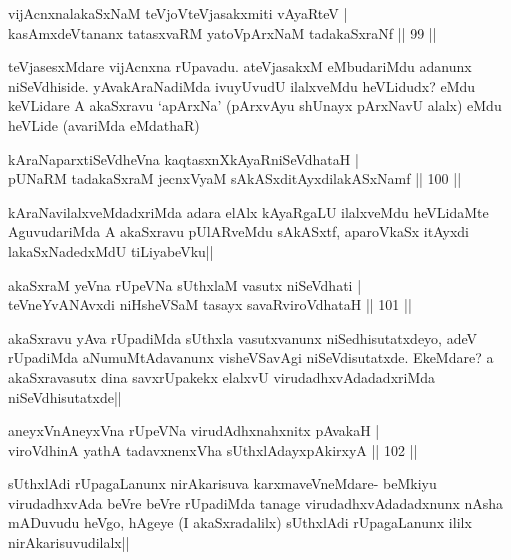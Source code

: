 \begin{shl}
vijAcnxnalakaSxNaM teVjoV\s teVjasakxmiti vAyaRteV |\\
kasAmxdeVtananx tatasxvaRM yatoV\s pArxNaM tadakaSxraNf \hfill || 99 ||
\end{shl}

\begin{artha}%
teVjasesxMdare vijAcnxna rUpavadu. ateVjasakxM eMbudariMdu adanunx niSeVdhiside. yAvakAraNadiMda ivuyUvudU ilalxveMdu heVLidudx? eMdu keVLidare A akaSxravu `apArxNa' (pArxvAyu shUnayx pArxNavU alalx) eMdu heVLide (avariMda eMdathaR)
\end{artha}


\begin{shl}
kAraNaparxtiSeVdheVna kaqtasxnXkAyaRniSeVdhataH |\\
pUNaRM tadakaSxraM jecnxVyaM sAkASxditAyxdilakASxNamf \hfill || 100 ||
\end{shl}

\begin{artha}
kAraNavilalxveMdadxriMda adara elAlx kAyaRgaLU ilalxveMdu heVLidaMte AguvudariMda A akaSxravu pUlARveMdu sAkASxtf, aparoVkaSx itAyxdi lakaSxNadedxMdU tiLiyabeVku||
\end{artha}

\begin{shl}
akaSxraM yeVna rUpeVNa sUthxlaM vasutx niSeVdhati |\\
teVneYvANAvxdi niHsheVSaM tasayx savaRviroVdhataH \hfill || 101 ||
\end{shl}

\begin{artha}
akaSxravu yAva rUpadiMda sUthxla vasutxvanunx niSedhisutatxdeyo, adeV rUpadiMda aNumuMtAdavanunx visheVSavAgi niSeVdisutatxde. EkeMdare? a akaSxravasutx dina savxrUpakekx elalxvU virudadhxvAdadadxriMda niSeVdhisutatxde||
\end{artha}

\begin{shl}
aneyxVnAneyxVna rUpeVNa virudAdhxnahxnitx pAvakaH |\\
viroVdhinA yathA tadavxnenxVha sUthxlAdayxpAkirxyA \hfill || 102 ||
\end{shl}

\begin{artha}%
sUthxlAdi rUpagaLanunx nirAkarisuva karxmaveVneMdare- beMkiyu virudadhxvAda beVre beVre rUpadiMda tanage virudadhxvAdadadxnunx nAsha mADuvudu heVgo, hAgeye (I akaSxradalilx) sUthxlAdi rUpagaLanunx ililx nirAkarisuvudilalx||
\end{artha}

